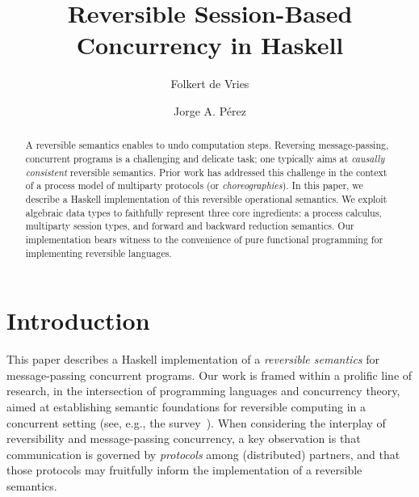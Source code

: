 \documentclass[runningheads,plain]{llncs}
\begin{document}
\title{Reversible Session-Based Concurrency in Haskell}

\author{Folkert de Vries \and
Jorge A. P\'{e}rez%
}
%
%
\maketitle



\begin{abstract}
A reversible semantics enables to undo computation steps. 
Reversing  
message-passing, concurrent programs is a
challenging and delicate task; one typically aims at
\emph{causally consistent} reversible semantics.
Prior work has addressed this
challenge in the context of a process model of multiparty protocols
(or \emph{choreographies}).
In this paper, we describe a Haskell implementation of 
this reversible operational semantics. 
We exploit algebraic data types to faithfully represent
three core ingredients: a process
calculus, multiparty session types, and forward and backward reduction semantics.
Our implementation bears witness to the convenience of pure functional programming for implementing reversible languages.
\end{abstract}





\section{Introduction}
This paper describes a Haskell implementation of 
a \emph{reversible semantics} for message-passing concurrent programs. 
Our work is framed within a prolific line of research, 
in the intersection of programming languages and concurrency theory,
aimed at establishing  semantic foundations for reversible computing in a 
concurrent setting (see, e.g., the survey~\cite{DBLP:journals/eatcs/Lanese14}).
When considering the interplay of reversibility and message-passing concurrency, 
a key observation  is that
 communication is governed by
\emph{protocols} among  (distributed) partners, and that 
 those protocols may fruitfully inform the implementation of a reversible semantics.
\end{document}
